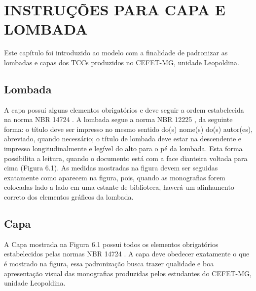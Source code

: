 \documentclass[
        oneside,      %
        english,			
        brazil			 
        ]{configcefetmglpd}
\begin{document}
\chapter{INSTRUÇÕES PARA CAPA E LOMBADA}
Este capítulo foi introduzido ao modelo com a finalidade de padronizar as lombadas e capas dos TCCs produzidos no CEFET-MG, 
unidade Leopoldina.

\section{Lombada}
A capa possui alguns elementos obrigatórios e deve seguir a ordem estabelecida na norma NBR 14724 \cite{bib:abnt14724}. 
A lombada segue a norma NBR 12225 \cite{bib:abnt1225}, da seguinte forma: o título deve ser impresso no mesmo sentido do(s) 
nome(s) do(s) autor(es), abreviado, quando necessário; o título de lombada deve estar na descendente e impresso longitudinalmente 
e legível do alto para o pé da lombada. Esta forma possibilita a leitura, quando o documento está com a face dianteira voltada 
para cima (Figura 6.1). As medidas mostradas na figura devem ser seguidas exatamente como aparecem na figura, pois, quando as 
monografias forem colocadas lado a lado em uma estante de biblioteca, haverá um alinhamento correto dos elementos gráficos da
lombada.

\section{Capa}
A Capa mostrada na Figura 6.1 possui todos os elementos obrigatórios estabelecidos pelas normas NBR 14724 \cite{bib:abnt14724}. 
A capa deve obedecer exatamente o que é mostrado na figura, essa padronização busca trazer qualidade e boa apresentação visual das monografias produzidas pelos estudantes do CEFET-MG, unidade Leopoldina.
\end{document}
